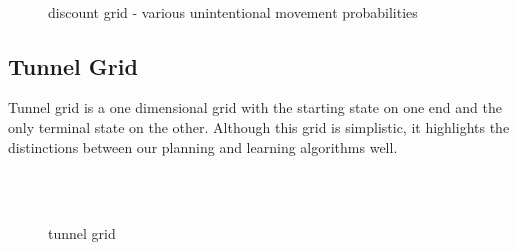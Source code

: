 \documentclass{sig-alternate}
\begin{document}
\begin{figure}[!htbp]
    \centering
    ~
    \\
    \caption{discount grid - various unintentional movement probabilities}
\end{figure} 


\subsection{Tunnel Grid}

Tunnel grid is a one dimensional grid with the starting state on one end and the only terminal state on the other. Although this grid is simplistic, it highlights the distinctions between our planning and learning algorithms well.

\begin{figure}[!htbp]
    \centering
    \\
    \\
    \caption{tunnel grid}
\end{figure} 
\end{document}
